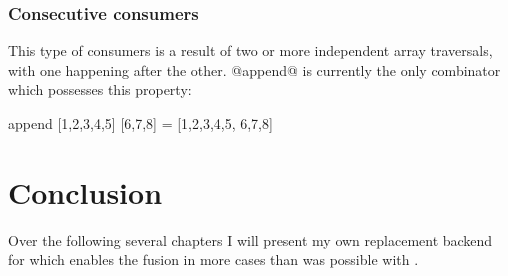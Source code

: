\documentclass[preamble.tex]{subfiles}
\begin{document}
\subsubsection{Consecutive consumers}

This type of consumers is a result of two or more independent array traversals, with one happening after the other. @append@ is currently the only combinator which possesses this property:

\begin{hscode}
append [1,2,3,4,5] [6,7,8] = [1,2,3,4,5, 6,7,8]
\end{hscode}


\section{Conclusion}

Over the following several chapters I will present my own replacement backend for  which enables the fusion in more cases than was possible with .


\IfNotCompilingAll{}
\end{document}
